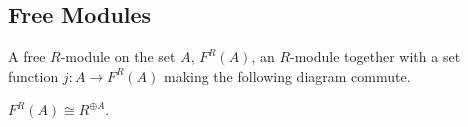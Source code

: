 \subsection{Free Modules}\label{freemodules}
A free $R$-module on the set $A$, $F^R(A)$, an $R$-module together with a set
function $j : A \rightarrow F^R(A)$ making the following diagram commute.
\begin{figure}[H]
\centering

\end{figure}

\begin{proposition}
$F^R(A) \cong R^{\oplus A}$.
\end{proposition}